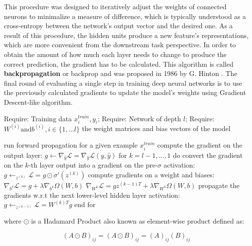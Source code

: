 This procedure was designed to iteratively adjust the weights of connected neurons to minimalize a measure of difference, which is typically understood as a cross-entropy between the network's output vector and the desired one. As a result of this procedure, the hidden units produce a new feature's representations, which are more convenient from the downstream task perspective.  In order to obtain the amount of how much each layer needs to change to produce the correct prediction, the gradient has to be calculated. This algorithm is called \textbf{backpropagation} or backprop and was proposed in 1986 by G. Hinton \cite{backprop}. 
The final round of evaluating a single step in training deep neural networks is to use the previously calculated gradients to update the model's weights using Gradient Descent-like algorithm. 



\begin{algorithm}[caption={Backward propagation of feed-forward neural network }, label={alg:backward_prop}]
Require: Training data ${x^{train}_{i} , y_{i}}$;
Require: Network of depth $l$;
Require: $W^{(i)} \textrm{and}  b^{(i)}, i \in \{ 1, \ldots l \}$ the weight matrices and bias vectors of the model

run forward propagation for a given example $x^{train}_{i}$
compute the gradient on the output layer: 
$g \leftarrow \nabla_{\hat{y}} \mathcal{L} =  \nabla_{\hat{y}} \mathcal{L}(y, \hat{y})$ 
for $k = l-1, \ldots, 1$ do
   convert the gradient on the $k$-th layer output into a gradient on the pre-$\sigma$ activation: 
   $g \leftarrow_{z^{(k)}} \mathcal{L} = g \odot \sigma'(z^{(k)})$
   compute gradients on a weight and biases:
   $\nabla_{b^{k}} \mathcal{L}  = g + \lambda \nabla_{b^{k}} \Omega(W, b) $ 
   $\nabla_{W^{k}} \mathcal{L}  = g z^{(k-1)T} + \lambda \nabla_{W^{k}} \Omega(W, b) $ 
   propagate the gradients w.r.t the next lower-level hidden layer activation:
   $g \leftarrow_{z^{(k-1)}} \mathcal{L} = W^{(k)T}g$
end for
\end{algorithm}

where $\odot$ is a Hadamard Product also known as element-wise product defined as:

\begin{equation}
    (A \odot B)_{ij} = (A \odot B)_{ij} = (A)_{ij} (B)_{ij}
\end{equation}

